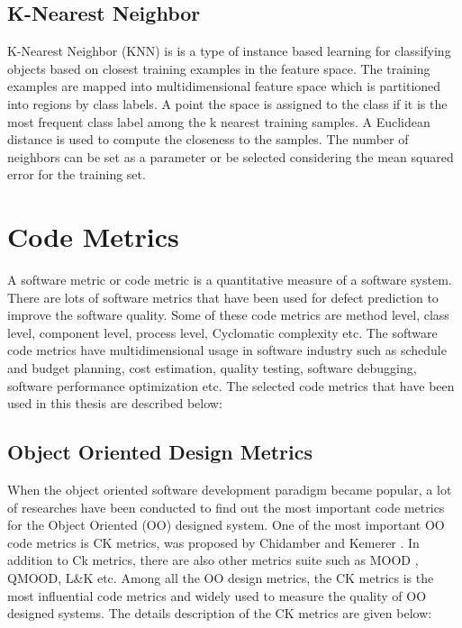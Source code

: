 \documentclass[12pt]{report}
\begin{document}
\subsection{K-Nearest Neighbor}

K-Nearest Neighbor (KNN) is is a type of instance based learning for classifying objects based on closest training examples in the feature space. The training examples are mapped into multidimensional feature space which is partitioned into regions by class labels. A point the space is assigned to the class if it is the most frequent class label among the k nearest training samples. A Euclidean distance is used to compute the closeness to the samples. The number of neighbors can be set as a parameter or be selected considering the mean squared error for the training set. 


\section{Code Metrics}
\label{software_code_metrics_description}
A software metric or code metric is a quantitative measure of a software system. There are lots of software metrics that have been used for defect prediction to improve the software quality. Some of these code metrics are method level, class level, component level, process level, Cyclomatic complexity etc. The software code metrics have multidimensional usage in software industry such as schedule and budget planning, cost estimation, quality testing, software debugging, software performance optimization etc. The selected code metrics that have been used in this thesis are described below:


\subsection{Object Oriented Design Metrics}
\label{Code_Metrics_background_study}
When the object oriented software development paradigm became popular, a lot of researches have been conducted to find out the most important code metrics for the Object Oriented (OO) designed system. One of the most important OO code metrics is CK metrics, was proposed by Chidamber and Kemerer \cite{chidamber1994metrics}. In addition to Ck metrics, there are also other metrics suite such as MOOD \cite{bansiya2002hierarchical}, QMOOD, L\&K etc. Among all the OO design metrics, the CK metrics is the most influential code metrics and widely used to measure the quality of OO designed systems. The details description of the CK metrics are given below:
\end{document}
